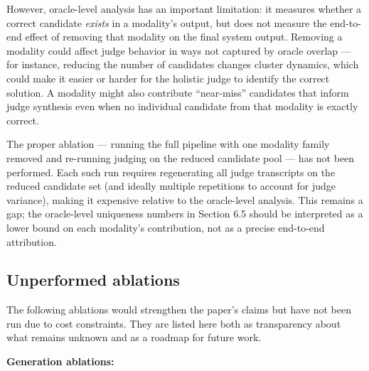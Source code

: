 \documentclass[11pt]{article}
\begin{document}
However, oracle-level analysis has an important limitation: it measures
whether a correct candidate \emph{exists} in a modality's output, but
does not measure the end-to-end effect of removing that modality on the
final system output. Removing a modality could affect judge behavior in
ways not captured by oracle overlap --- for instance, reducing the
number of candidates changes cluster dynamics, which could make it
easier or harder for the holistic judge to identify the correct
solution. A modality might also contribute ``near-miss'' candidates that
inform judge synthesis even when no individual candidate from that
modality is exactly correct.

The proper ablation --- running the full pipeline with one modality
family removed and re-running judging on the reduced candidate pool ---
has not been performed. Each such run requires regenerating all judge
transcripts on the reduced candidate set (and ideally multiple
repetitions to account for judge variance), making it expensive relative
to the oracle-level analysis. This remains a gap; the oracle-level
uniqueness numbers in Section 6.5 should be interpreted as a lower bound
on each modality's contribution, not as a precise end-to-end
attribution.

\hypertarget{unperformed-ablations}{%
\subsection{Unperformed ablations}\label{unperformed-ablations}}

The following ablations would strengthen the paper's claims but have not
been run due to cost constraints. They are listed here both as
transparency about what remains unknown and as a roadmap for future
work.

\textbf{Generation ablations:}
\end{document}
